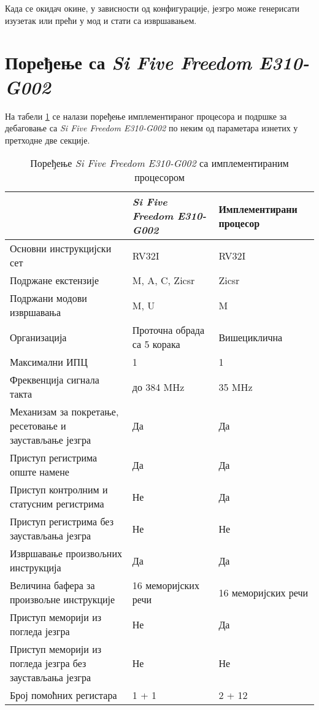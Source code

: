 Када се окидач окине, у зависности од конфигурације, језгро може генерисати изузетак или прећи у  мод и стати са извршавањем.

\section{Поређење са \textit{Si Five Freedom E310-G002}}

На табели \ref{table:comp} се налази поређење имплементираног процесора и подршке за дебаговање са \textit{Si Five Freedom E310-G002} \cite{hifive_manual} по неким од параметара изнетих у претходне две секције.

\begin{table}[h!]
	\centering
	\caption{Поређење \textit{Si Five Freedom E310-G002} са имплементираним процесором}
	\label{table:comp}
	\begin{tabular}{|p{5.5cm}|l|l|} 
		\hline \rowcolor{lightgray} & \textit{Si Five Freedom E310-G002} & Имплементирани процесор \\
		\hline Основни инструкцијски сет & RV32I & RV32I \\
		\hline Подржане екстензије & M, A, C, Zicsr & Zicsr \\
		\hline Подржани модови извршавања & M, U & M \\
		\hline Организација & Проточна обрада са 5 корака & Вишециклична \\
		\hline Максимални \acrshort{ИПЦ}\footnotemark & 1 & 1 \\
		\hline Фреквенција сигнала такта & до 384 MHz & 35 MHz \\
		\hline Механизам за покретање, ресетовање и заустављање језгра & Да & Да \\
		\hline Приступ регистрима опште намене & Да & Да \\
		\hline Приступ контролним и статусним регистрима & Не & Да \\
		\hline Приступ регистрима без заустављања језгра & Не & Не \\
		\hline Извршавање произвољних инструкција & Да & Да \\
		\hline Величина бафера за произвољне инструкције & 16 меморијских речи & 16 меморијских речи \\
		\hline Приступ меморији из погледа језгра & Не & Да \\
		\hline Приступ меморији из погледа језгра без заустављања језгра & Не & Не \\
		\hline Број помоћних регистара\footnotemark & 1 + 1 & 2 + 12 \\

\end{tabular}
\end{table}

